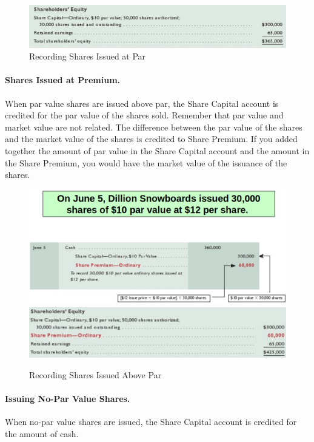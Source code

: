 \documentclass[../main.tex]{subfiles}
\begin{document}
	\begin{figure}[ht]
		\centering
		\includegraphics[width=\columnwidth]{images/c9/share_issue_par_eg1.png}
		\caption{Recording Shares Issued at Par}
	\end{figure}
	
	\paragraph{Shares Issued at Premium.} When par value shares are issued 
	above par, the Share Capital account is credited for the par value of the 
	shares sold. Remember that par value and market value are not related.  
	The difference between the par value of the shares and the market value of 
	the shares is credited to Share Premium.  If you added together the amount 
	of par value in the Share Capital account and the amount in the Share 
	Premium, you would have the market value of the issuance of the shares.  
	
	\begin{figure}[ht]
		\centering
		\includegraphics[width=\columnwidth]{images/c9/above_par_share_eg.png}
		\includegraphics[width=\columnwidth]{images/c9/share_above_par_eg2.png}
		\caption{Recording Shares Issued Above Par}
	\end{figure}
	
	\paragraph{Issuing No-Par Value Shares.} When no-par value shares are 
	issued, the Share Capital account is credited for the amount of cash.
\end{document}
